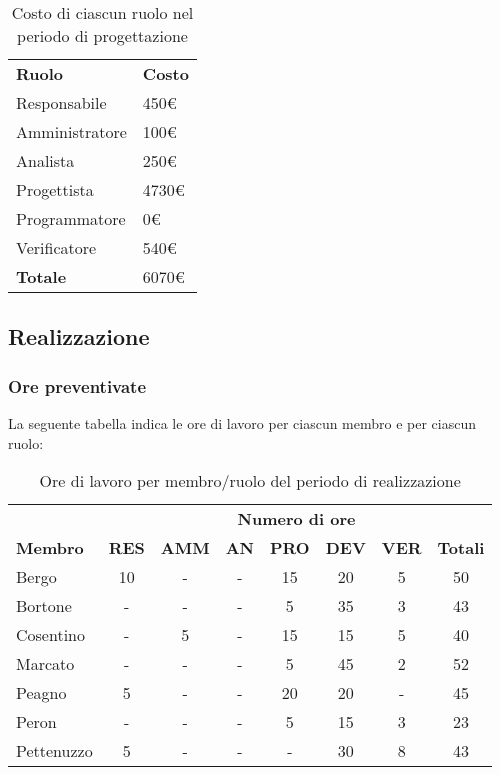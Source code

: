		\begin{table}[h]
		\centering
		\begin{tabular}{| l | l |}
			\rowcolor{LightBlue}
			\textbf{\color{white}Ruolo}
			& \textbf{\color{white}Costo}\\
			
			Responsabile 		& 450€\\
			Amministratore 	& 100€\\
			Analista 				& 250€\\			
			Progettista 			& 4730€\\
			Programmatore 		& 0€\\
			Verificatore 		& 540€\\ \hline
			\textbf{Totale} 	& 6070€\\ \hline
		\end{tabular}		
		\caption{Costo di ciascun ruolo nel periodo di progettazione}
		\end{table}
		
\newpage
\subsection{Realizzazione}
	\subsubsection{Ore preventivate}
		La seguente tabella indica le ore di lavoro per ciascun membro e per ciascun ruolo:
		\begin{table}[h]
		\centering
		\begin{tabular}{| l | c c c c c c | c |}
			\rowcolor{LightBlue}
			& \multicolumn{7}{c}{\textbf{\color{white}Numero di ore}}	\\

			\rowcolor{LightBlue}
			\textbf{\color{white}Membro}
			& \textbf{\color{white}RES}
			& \textbf{\color{white}AMM}
			& \textbf{\color{white}AN}
			& \textbf{\color{white}PRO}
			& \textbf{\color{white}DEV}
			& \textbf{\color{white}VER}
			& \textbf{\color{white}Totali}\\

			Bergo      & 10 & - & - & 15 & 20 & 5 & 50 \\
			Bortone    & - & - & - & 5 & 35 & 3 & 43  \\
			Cosentino  & - & 5 & - & 15 & 15 & 5 & 40 \\
			Marcato    & - & - & - & 5 & 45 & 2 & 52 \\
			Peagno     & 5 & - & - & 20 & 20 & - & 45 \\
			Peron      & - & - & - & 5 & 15 & 3 & 23 \\
			Pettenuzzo & 5 & - & - & - & 30 & 8 & 43 \\ \hline
		\end{tabular}
		\caption{Ore di lavoro per membro/ruolo del periodo di realizzazione}
		\end{table}
		
